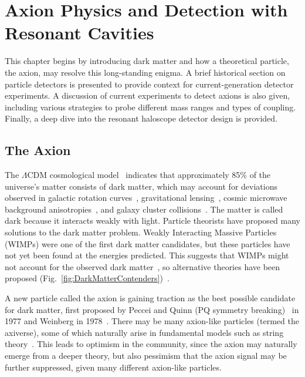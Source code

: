 \chapter{Axion Physics and Detection with Resonant Cavities}

This chapter begins by introducing dark matter and how a theoretical particle, the axion, may resolve this long-standing enigma. A brief historical section on particle detectors is presented to provide context for current-generation detector experiments. A discussion of current experiments to detect axions is also given, including various strategies to probe different mass ranges and types of coupling. Finally, a deep dive into the resonant haloscope detector design is provided.

    \section{The Axion} \label{sec:axion}
    
    The $\Lambda$CDM cosmological model~\cite{popoloSmallScaleProblems2017} indicates that approximately 85\% of the universe’s matter consists of dark matter, which may account for deviations observed in galactic rotation curves~\cite{Begeman:1991iy}, gravitational lensing~\cite{Clowe:2006eq}, cosmic microwave background anisotropies~\cite{WMAP:2010qai}, and galaxy cluster collisions~\cite{zwickyRotverschiebungExtragalaktischenNebeln1933}. The matter is called dark because it interacts weakly with light. Particle theorists have proposed many solutions to the dark matter problem. Weakly Interacting Massive Particles (WIMPs) were one of the first dark matter candidates, but these particles have not yet been found at the energies predicted. This suggests that WIMPs might not account for the observed dark matter~\cite{Malik:2012sa, lowetteSupersymmetrySearchesATLAS2012}, so alternative theories have been proposed (Fig.~\ref{fig:DarkMatterContenders})~\cite{rosenbergSearchingDarkHunt2018}.


    A new particle called the axion is gaining traction as the best possible candidate for dark matter, first proposed by Peccei and Quinn (PQ symmetry breaking)~\cite{pecceiMathrmCPConservation1977} in 1977 and Weinberg in 1978~\cite{Weinberg:1978ma}. There may be many axion-like particles (termed the axiverse), some of which naturally arise in fundamental models such as string theory~\cite{Witten:1997sc}. This leads to optimism in the community, since the axion may naturally emerge from a deeper theory, but also pessimism that the axion signal may be further suppressed, given many different axion-like particles.

